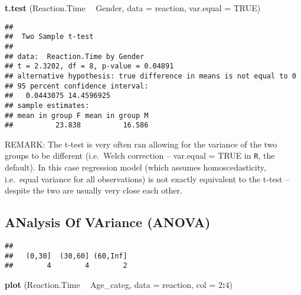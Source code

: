 \documentclass[
]{article}
\newenvironment{Shaded}{\begin{snugshade}}{\end{snugshade}}
\newcommand{\DataTypeTok}[1]{\textcolor[rgb]{0.13,0.29,0.53}{#1}}
\newcommand{\DecValTok}[1]{\textcolor[rgb]{0.00,0.00,0.81}{#1}}
\newcommand{\KeywordTok}[1]{\textcolor[rgb]{0.13,0.29,0.53}{\textbf{#1}}}
\newcommand{\NormalTok}[1]{#1}
\newcommand{\OperatorTok}[1]{\textcolor[rgb]{0.81,0.36,0.00}{\textbf{#1}}}
\newcommand{\OtherTok}[1]{\textcolor[rgb]{0.56,0.35,0.01}{#1}}
\newcommand{\StringTok}[1]{\textcolor[rgb]{0.31,0.60,0.02}{#1}}
\begin{document}
\begin{Shaded}
\begin{Highlighting}[]
\KeywordTok{t.test}\NormalTok{ (Reaction.Time }\OperatorTok{~}\StringTok{ }\NormalTok{Gender, }\DataTypeTok{data =}\NormalTok{ reaction, }\DataTypeTok{var.equal =} \OtherTok{TRUE}\NormalTok{)}
\end{Highlighting}
\end{Shaded}

\begin{verbatim}
## 
##  Two Sample t-test
## 
## data:  Reaction.Time by Gender
## t = 2.3202, df = 8, p-value = 0.04891
## alternative hypothesis: true difference in means is not equal to 0
## 95 percent confidence interval:
##   0.0443075 14.4596925
## sample estimates:
## mean in group F mean in group M 
##          23.838          16.586
\end{verbatim}

REMARK: The t-test is very often ran allowing for the variance of the
two groups to be different (i.e.~Welch correction -- var.equal = TRUE in
\texttt{R}, the default). In this case regression model (which assumes
homoscedasticity, i.e.~equal variance for all observations) is not
exactly equivalent to the t-test -- despite the two are usually very
close each other.

\hypertarget{analysis-of-variance-anova}{%
\subsection{ANalysis Of VAriance
(ANOVA)}\label{analysis-of-variance-anova}}

\begin{Shaded}
\end{Shaded}

\begin{verbatim}
## 
##   (0,30]  (30,60] (60,Inf] 
##        4        4        2
\end{verbatim}

\begin{Shaded}
\begin{Highlighting}[]
\KeywordTok{plot}\NormalTok{ (Reaction.Time }\OperatorTok{~}\StringTok{ }\NormalTok{Age_categ, }\DataTypeTok{data =}\NormalTok{ reaction, }\DataTypeTok{col =} \DecValTok{2}\OperatorTok{:}\DecValTok{4}\NormalTok{)}
\end{Highlighting}
\end{Shaded}
\end{document}
